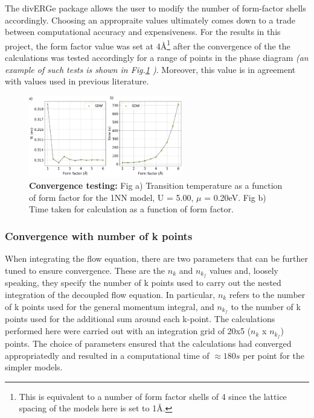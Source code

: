 \documentclass[12pt]{article}
\begin{document}
\medskip


\noindent The divERGe package allows the user to modify the number of form-factor shells accordingly. Choosing an appropraite values ultimately comes down to a trade 
between computational accuracy and expensiveness. 
For the results in this project, the form factor value was set at 4\AA\footnote{This is equivalent to a number of form factor shells of 4 since the lattice spacing of the models here is set to 1\AA.} after the convergence of the 
the calculations was tested accordingly for a range of points in the phase diagram \textit{(an example of such tests is shown in Fig.\ref{fig:Formfactorconvergence} )}. Moreover, this value is in agreement with values used in previous literature\cite{lichtenstein2018functional}. 

\begin{figure}[htbp]  %
    \centering
    \includegraphics[width=0.6\textwidth]{convergence.png}  %
    \caption{\textbf{Convergence testing:} Fig a) Transition temperature as a function of form factor for the 1NN model, U = 5.00, $\mu$ = 0.20eV. Fig b) Time taken for calculation
    as a function of form factor.   }
    \label{fig:Formfactorconvergence}
\end{figure}







\subsubsection{Convergence with number of k points }

When integrating the flow equation, there are two parameters that can be further tuned to ensure convergence.
These are the $n_k$ and $n_{k_f}$ values and, loosely speaking, they specify the number of k points used to carry out the nested integration of the decoupled flow equation. 
In particular, $n_k$ refers to the number of k points used for the general momentum integral, and $n_{k_f}$ to the number of k points used for 
the additional sum around each k-point. The calculations performed here were carried out with an integration 
grid of 20x5 ($n_k$ x $n_{k_f}$) points. The choice of parameters ensured that the calculations had converged appropriatedly 
and resulted in a computational time of $\approx 180s$ per point for the simpler models. 
\end{document}
